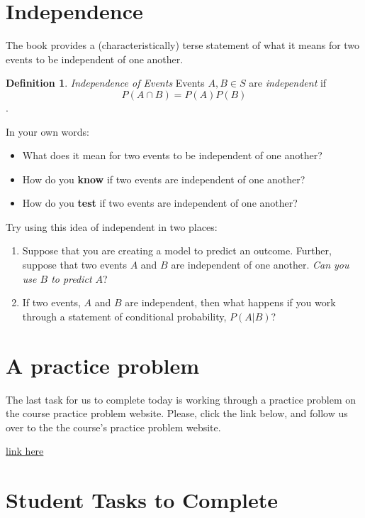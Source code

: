 \documentclass[
]{book}
\providecommand{\tightlist}{%
  \setlength{\itemsep}{0pt}\setlength{\parskip}{0pt}}
\theoremstyle{definition}
\newtheorem{definition}{Definition}[chapter]
\theoremstyle{definition}
\theoremstyle{definition}
\theoremstyle{definition}
\theoremstyle{remark}
\begin{document}
\section{Independence}\label{independence}

The book provides a (characteristically) terse statement of what it means for two events to be independent of one another.

\begin{definition}
\emph{Independence of Events} Events \(A, B \in S\) are \emph{independent} if \[P(A \cap B) = P(A)P(B)\].
\end{definition}

In your own words:

\begin{itemize}
\tightlist
\item
  What does it mean for two events to be independent of one another?
\item
  How do you \textbf{know} if two events are independent of one another?
\item
  How do you \textbf{test} if two events are independent of one another?
\end{itemize}

Try using this idea of independent in two places:

\begin{enumerate}
\def\labelenumi{\arabic{enumi}.}
\tightlist
\item
  Suppose that you are creating a model to predict an outcome. Further, suppose that two events \(A\) and \(B\) are independent of one another. \emph{Can you use \(B\) to predict \(A\)}?
\item
  If two events, \(A\) and \(B\) are independent, then what happens if you work through a statement of conditional probability, \(P(A|B)\)?
\end{enumerate}

\section{A practice problem}\label{a-practice-problem}

The last task for us to complete today is working through a practice problem on the course practice problem website. Please, click the link below, and follow us over to the the course's practice problem website.

\href{https://mids-w203.github.io/practice_problems/}{link here}

\section{Student Tasks to Complete}\label{student-tasks-to-complete}
\end{document}
